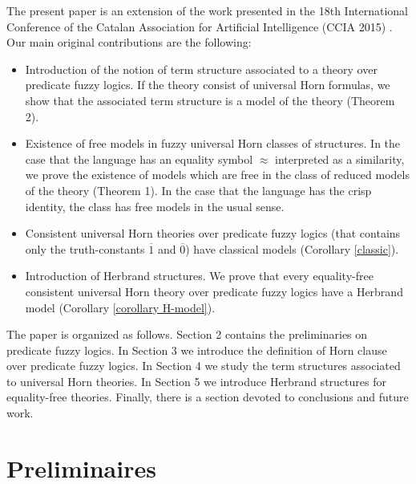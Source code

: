 \documentclass{IOS-Book-Article}
\begin{document}
\smallskip

The present paper is an extension of the work presented in the 18th International Conference of the Catalan Association for Artificial Intelligence (CCIA 2015) \cite{CoDe15}. Our main original contributions are the following:

\begin{itemize}
  \item Introduction of the notion of term structure associated to a theory over predicate fuzzy logics. If the theory consist of universal Horn formulas, we show that the associated term structure is a model of the theory (Theorem 2).
  \item Existence of free models in fuzzy universal Horn classes of structures. In the case that the language has an equality symbol $\approx$ interpreted as a similarity, we prove the existence of models which are free in the class of reduced models of the theory (Theorem 1). In the case that the language has the crisp identity, the class has free models in the usual sense.
 \item Consistent universal Horn theories over predicate fuzzy logics (that contains only the truth-constants $\overline{1}$ and $\overline{0}$) have classical models (Corollary \ref{classic}).
  \item Introduction of Herbrand structures. We prove that every equality-free consistent universal Horn theory over predicate fuzzy logics have a Herbrand model (Corollary \ref{corollary H-model}).
\end{itemize}

The paper is organized as follows. Section 2 contains the preliminaries on predicate fuzzy logics. In Section 3 we introduce the definition of Horn clause over predicate fuzzy logics. In Section 4 we study the term structures associated to universal Horn theories. In Section 5 we introduce Herbrand structures for equality-free theories. Finally, there is a section devoted to conclusions and future work. 



\section{Preliminaires}
\label{Preliminaires}
\end{document}
